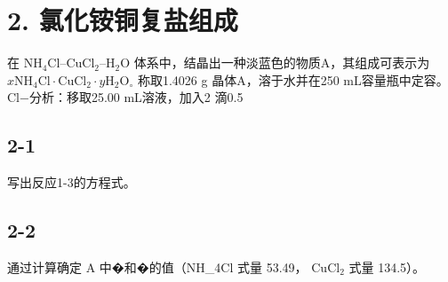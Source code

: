 \section*{2. 氯化铵铜复盐组成}
在 $\mathrm { N H _ { 4 } C l  – C u C l _ { 2 } – H _ { 2 } O }$ 体系中，结晶出⼀种淡蓝⾊的物质A，其组成可表⽰为 $x \mathrm { N H _ { 4 } C l { \cdot } C u C l _ { 2 } { \cdot } } y \mathrm { H _ { 2 } O _ { \circ } }$ 称取1.4026 g 晶体A，溶于⽔并在250 mL容量瓶中定容。Cl−分析：移取25.00 mL溶液，加⼊2 滴0.5%

\subsection*{2-1}
写出反应1-3的⽅程式。

\subsection*{2-2}
通过计算确定 A 中�和�的值（NH_{4}Cl 式量 53.49， $\mathrm { C u C l _ { 2 } }$ 式量 134.5）。
